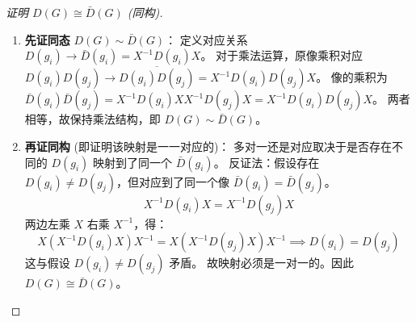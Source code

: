 \begin{proof}[证明 $D(G) \cong \bar{D}(G)$ (同构)]
    \begin{enumerate}
        \item \textbf{先证同态} $D(G) \sim \bar{D}(G)$：
        定义对应关系 $D(g_i) \to \bar{D}(g_i) = X^{-1}D(g_i)X$。
        对于乘法运算，原像乘积对应 $D(g_i)D(g_j) \to \overline{D(g_i)D(g_j)} = X^{-1} D(g_i) D(g_j) X$。
        像的乘积为 $\bar{D}(g_i)\bar{D}(g_j) = X^{-1}D(g_i)XX^{-1}D(g_j)X = X^{-1}D(g_i)D(g_j)X$。
        两者相等，故保持乘法结构，即 $D(G) \sim \bar{D}(G)$。

        \item \textbf{再证同构} (即证明该映射是一一对应的)：
        多对一还是对应取决于是否存在不同的 $D(g_i)$ 映射到了同一个 $\bar{D}(g_i)$。
        反证法：假设存在 $D(g_i) \neq D(g_j)$，但对应到了同一个像 $\bar{D}(g_i) = \bar{D}(g_j)$。
        \begin{equation}
            X^{-1}D(g_i)X = X^{-1}D(g_j)X
        \end{equation}
        两边左乘 $X$ 右乘 $X^{-1}$，得：
        \begin{equation}
            X(X^{-1}D(g_i)X)X^{-1} = X(X^{-1}D(g_j)X)X^{-1} \implies D(g_i) = D(g_j)
        \end{equation}
        这与假设 $D(g_i) \neq D(g_j)$ 矛盾。
        故映射必须是一对一的。因此 $D(G) \cong \bar{D}(G)$。
    \end{enumerate}
\end{proof}

